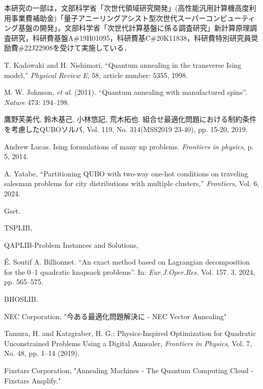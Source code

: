 \documentclass[submit,techrep,noauthor]{ipsj}
\begin{document}
\begin{acknowledgment}
本研究の一部は，文部科学省「次世代領域研究開発」(高性能汎用計算機高度利用事業費補助金)「量子アニーリングアシスト型次世代スーパーコンピューティング基盤の開発」，文部科学省「次世代計算基盤に係る調査研究」新計算原理調査研究，科研費基盤A\#19H01095，科研費基C\#20K11838，科研費特別研究員奨励費\#22J22908を受けて実施している．
\end{acknowledgment}

\begin{thebibliography}{10}

T. Kadowaki and H. Nishimori, “Quantum annealing in the transverse Ising model,” {\it Physical Review E}, 58, article number: 5355, 1998.

M. W. Johnson, {\it et al}. (2011). “Quantum annealing with manufactured spins”. {\it Nature} 473: 194–198.

鷹野芙美代, 鈴木基己, 小林悠記, 荒木拓也. 組合せ最適化問題における制約条件を考慮したQUBOソルバ, Vol. 119, No. 314(MSS2019 23-40), pp. 15-20, 2019.

Andrew Lucas. Ising formulations of many np problems. {\it Frontiers in physics}, p. 5, 2014.

A. Yatabe, “Partitioning QUBO with two-way one-hot conditions on traveling salesman problems for city distributions with multiple clusters,” {\it Frontiers}, Vol. 6, 2024.

Gset. 

TSPLIB, 

QAPLIB-Problem Instances and Solutions, 

É. Soutif A. Billionnet. “An exact method based on Lagrangian decomposition for the 0–1 quadratic knapsack problems”. In: {\it Eur.J.Oper.Res.} Vol. 157. 3. 2024, pp. 565–575.

BHOSLIB. 

NEC Corporation, "今ある最適化問題解決に - NEC Vector Annealing" 

Tamura, H. and Katzgraber, H. G.: Physics-Inspired Optimization for Quadratic Unconstrained Problems Using a Digital Annealer, {\it Frontiers in Physics}, Vol. 7, No. 48, pp. 1–14 (2019).

Fixstars Corporation, "Annealing Machines - The Quantum Computing Cloud - Fixstars Amplify." 

\end{thebibliography}
\end{document}

